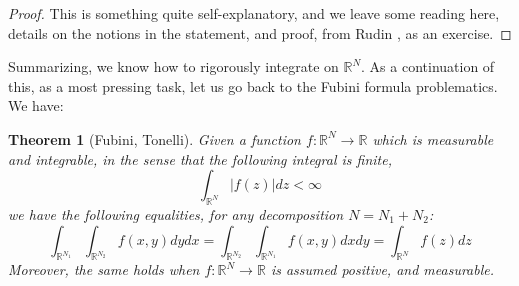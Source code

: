 \documentclass[12pt]{amsbook}
\newtheorem{theorem}{Theorem}[chapter]
\begin{document}
\begin{proof}
This is something quite self-explanatory, and we leave some reading here, details on the notions in the statement, and proof, from Rudin \cite{rud}, as an exercise.
\end{proof}

Summarizing, we know how to rigorously integrate on $\mathbb R^N$. As a continuation of this, as a most pressing task, let us go back to the Fubini formula problematics. We have:

\begin{theorem}[Fubini, Tonelli]
Given a function $f:\mathbb R^N\to\mathbb R$ which is measurable and integrable, in the sense that the following integral is finite,
$$\int_{\mathbb R^N}|f(z)|dz<\infty$$
we have the following equalities, for any decomposition $N=N_1+N_2$:
$$\int_{\mathbb R^{N_1}}\int_{\mathbb R^{N_2}}f(x,y)dydx=\int_{\mathbb R^{N_2}}\int_{\mathbb R^{N_1}}f(x,y)dxdy=\int_{\mathbb R^N}f(z)dz$$
Moreover, the same holds when $f:\mathbb R^N\to\mathbb R$ is assumed positive, and measurable. 
\end{theorem}
\end{document}
